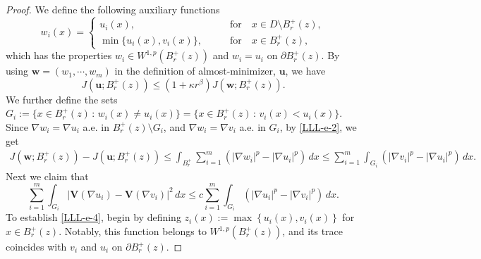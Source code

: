 \documentclass{amsart}
\begin{document}
\begin{proof}
We define the following auxiliary functions
\begin{equation}
\label{LLL-e-1}
w_i(x)=
\begin{cases}
u_i(x), \qquad & \text{for} \quad x \in D \setminus B_{r}^+(z), \\
\min\{ u_i(x), v_i(x) \}, \qquad & \text{for} \quad x \in B_{r}^+(z),
\end{cases}
\end{equation}
which has the properties
$w_i \in W^{1,p}\left(B_{r}^+(z)\right)$ and  $w_i=u_i$ on $\partial B_{r}^+(z)$. 
By using $\mathbf{w}=(w_1, \cdots, w_m)$ in the definition of almost-minimizer, $\mathbf{u}$, we have
\begin{equation}
\label{LLL-e-2}
J \left(\mathbf{u}; B_{r}^+(z) \right) \leq \left( 1+ \kappa r^{\beta} \right) J \left(\mathbf{w}; B_{r}^+(z) \right).
\end{equation}
We further define the sets $G_i :=\{ x \in B_{r}^+(z) \, : \, w_i(x) \neq u_i(x) \} = \{ x \in B_{r}^+(z) \, : \, v_i(x) < u_i(x)\}$. Since $\nabla w_i = \nabla u_i $ a.e. in $B_{r}^+(z) \setminus G_i$, and $\nabla w_i = \nabla v_i$ a.e. in $G_i$, by \eqref{LLL-e-2}, we get
\begin{align} %
J \left(\mathbf{w}; B_{r}^+(z) \right) - J \left(\mathbf{u}; B_{r}^+(z) \right) %
\leq \int_{B_{r}^+} \sum_{i=1}^{m} \left(|\nabla w_i|^p - |\nabla u_i|^p \right) \, dx %
\label{LLL-e-3}
\leq  \sum_{i=1}^{m} \int_{G_i} \left( |\nabla v_i|^p - |\nabla u_i|^p \right) \, dx. 
\end{align}
Next we claim that 
\begin{equation} 
\label{LLL-e-4} 
 \sum_{i=1}^{m} \int_{G_i} \left| \mathbf{V}(\nabla u_i) - \mathbf{V}(\nabla v_i) \right|^2 \, dx \leq c \sum_{i=1}^{m}  \int_{G_i} \left( \left| \nabla u_i \right|^p - \left| \nabla v_i \right|^p \right) \, dx.
\end{equation}
To establish \eqref{LLL-e-4}, begin by defining $z_i(x):=\max\left\{u_i(x), v_i(x) \right\}$ for $x \in B_{r}^+(z)$. Notably, this function belongs to $W^{1,p}(B_{r}^+(z))$, and its trace coincides with $v_i$ and $u_i$ on $\partial B_{r}^+(z)$.


\end{proof}
\end{document}
